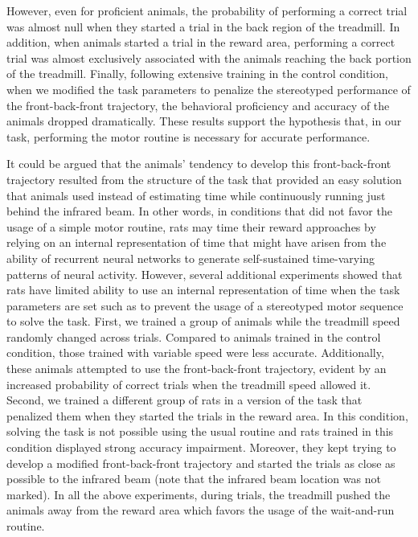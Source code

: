 However, even for proficient animals, the probability of performing a correct trial was almost null when they started a trial in the back region of the treadmill.
In addition, when animals started a trial in the reward area, performing a correct trial was almost exclusively associated with the animals reaching the back portion of the treadmill.
Finally, following extensive training in the control condition, when we modified the task parameters to penalize the stereotyped performance of the front-back-front trajectory, the behavioral proficiency and accuracy of the animals dropped dramatically.
These results support the hypothesis that, in our task, performing the motor routine is necessary for accurate performance.
\par
It could be argued that the animals' tendency to develop this front-back-front trajectory resulted from the structure of the task that provided an easy solution that animals used instead of estimating time while continuously running just behind the infrared beam.
In other words, in conditions that did not favor the usage of a simple motor routine, rats may time their reward approaches by relying on an internal representation of time that might have arisen from the ability of recurrent neural networks to generate self-sustained time-varying patterns of neural activity\cite{Buonomano2011chapter}.
However, several additional experiments showed that rats have limited ability to use an internal representation of time when the task parameters are set such as to prevent the usage of a stereotyped motor sequence to solve the task.
First, we trained a group of animals while the treadmill speed randomly changed across trials.
Compared to animals trained in the control condition, those trained with variable speed were less accurate.
Additionally, these animals attempted to use the front-back-front trajectory, evident by an increased probability of correct trials when the treadmill speed allowed it.
Second, we trained a different group of rats in a version of the task that penalized them when they started the trials in the reward area.
In this condition, solving the task is not possible using the usual routine and rats trained in this condition displayed strong accuracy impairment.
Moreover, they kept trying to develop a modified front-back-front trajectory and started the trials as close as possible to the infrared beam (note that the infrared beam location was not marked).
In all the above experiments, during trials, the treadmill pushed the animals away from the reward area which favors the usage of the wait-and-run routine.
